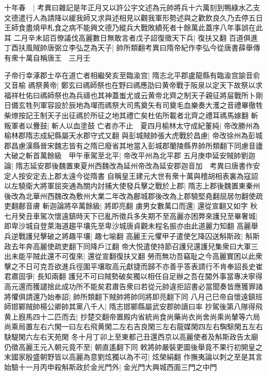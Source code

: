 十年春　|{
	考異曰雜記是年正月又以許公宇文述為元帥將兵十六萬刻到鴨綠水乙支文德遣行人為請降以緩我師又求與述相見以觀我軍形勢述與之歡飲良久乃去停五日王師食盡燒甲札食之病不能興文德乃縱兵大戰敗績死者十餘萬此蓋序八年事誤在此耳}
二月辛未詔百僚議伐高麗數日無敢言者戊子詔復徵天下兵|{
	復扶又翻}
百道俱進　丁酉扶風賊帥唐弼立李弘芝為天子|{
	帥所類翻考異曰隋帝紀作李弘今從唐書薛舉傳}
有衆十萬自稱唐王　三月壬

子帝行幸涿郡士卒在道亡者相繼癸亥至臨渝宫|{
	隋志北平郡盧龍縣有臨渝宫諭音俞又音榆}
禡祭黄帝|{
	鄭玄曰禡師祭也在野曰禡應劭曰黄帝戰于阪泉以定天下故祭以求福祥杜佑曰禡師祭也為兵禱也其神蓋蚩尤或云黄帝北齊之制天子親征將屇戰所卜剛日備玄牲列軍容設於辰地為墠而禡祭大司馬奠矢有司奠毛血樂奏大濩之音禮畢徹牲柴燎按記王制天子出征禡於所征之地其禮亡矣杜佑所載者北齊之禮耳禡馬嫁翻}
斬叛軍者以釁鼓|{
	斬人以血塗鼓}
亡者亦不止　夏四月榆林太守成紀董純|{
	帝改勝州為榆林郡隋志成紀縣屬天水郡守式又翻}
與彭城賊帥張大虎戰於昌慮|{
	帝改徐州為彭城郡昌慮漢縣晉宋魏志皆有之隋已廢省其地當入彭城郡蘭陵縣界帥所類翻下同慮音廬}
大破之斬首萬餘級　甲午車駕至北平|{
	帝改平州為北平郡}
五月庚申延安賊帥劉迦論|{
	隋志延安郡後魏置東夏州西魏改為延州帝改為延安郡迦音加　考異曰唐書作安定人按安定去上郡太遠今從隋書}
自稱皇王建元大世有衆十萬與稽胡相表裏為寇詔以左驍衛大將軍屈突通為關内討捕大使發兵擊之戰於上郡|{
	隋志上郡後魏置東秦州後改為北華州西魏改為敷州大業二年改為鄜城郡後改為上郡驍堅堯翻屈居勿翻使疏吏翻鄜音膚}
斬迦論將卒萬餘級|{
	將即亮翻}
虜男女數萬口而還|{
	還從宣翻又如字}
秋七月癸丑車駕次懷遠鎮時天下已亂所徵兵多失期不至高麗亦困弊來護兒至畢奢城|{
	即卑沙城自登萊海道趨平壤先至卑沙城唐貞觀未程名振亦由此道麗力知翻}
高麗舉兵逆戰護兒擊破之將趣平壤|{
	趣七喻翻}
高麗王元懼甲子遣使乞降囚送斛斯政|{
	斛斯政去年奔高麗使疏吏翻下同降戶江翻}
帝大悦遣使持節召護兒還護兒集衆曰大軍三出未能平賊此還不可復來|{
	還從宣翻復扶又翻}
勞而無功吾竊耻之今高麗實困以此衆擊之不日可克吾欲進兵徑圍平壤取高元獻捷而歸不亦善乎答表請行不肯奉詔長史崔君肅固爭|{
	長知兩翻}
護兒不可曰賊勢破矣獨以相任自足辦之吾在閫外事當專决寧得高元還而獲譴捨此成功所不能矣君肅告衆曰若從元帥違拒詔書必當聞奏皆應獲罪諸將懼俱請還乃始奉詔|{
	帥所類翻下賊帥將帥同將即亮翻下同}
八月己巳帝自懷遠鎮班師邯鄲賊帥楊公卿帥其黨八千人|{
	隋志邯鄲縣屬武安郡帥讀曰率}
抄駕後第八隊得飛黄上廐馬四十二匹而去|{
	抄楚交翻帝置殿内省統尚食尚藥尚衣尚舍尚乘尚輦等六局尚乘局置左右六閑一曰左右飛黄閑二左右吉良閑三左右龍媒閑四左右騊駼閑五左右駃騠閑六左右天苑閑}
冬十月丁卯上至東都己丑還西京以高麗使者及斛斯政告太廟仍徵高麗王元入朝元竟不至|{
	朝直遙翻下同}
敕將帥嚴裝更圖後舉竟不果行初開皇之末國家殷盛朝野皆以高麗為意劉炫獨以為不可|{
	炫榮絹翻}
作撫夷論以刺之至是其言始驗十一月丙申殺斛斯政於金光門外|{
	金光門大興城西面三門之中門}
